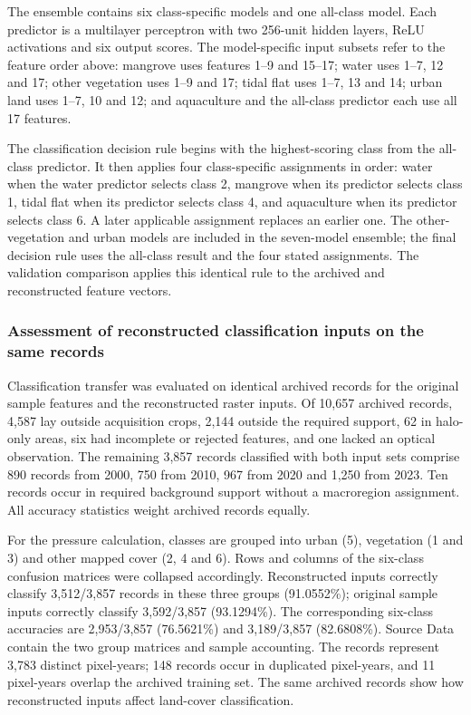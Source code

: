 The ensemble contains six class-specific models and one all-class model. Each predictor is a multilayer perceptron with two 256-unit hidden layers, ReLU activations and six output scores. The model-specific input subsets refer to the feature order above: mangrove uses features 1--9 and 15--17; water uses 1--7, 12 and 17; other vegetation uses 1--9 and 17; tidal flat uses 1--7, 13 and 14; urban land uses 1--7, 10 and 12; and aquaculture and the all-class predictor each use all 17 features.

The classification decision rule begins with the highest-scoring class from the all-class predictor. It then applies four class-specific assignments in order: water when the water predictor selects class 2, mangrove when its predictor selects class 1, tidal flat when its predictor selects class 4, and aquaculture when its predictor selects class 6. A later applicable assignment replaces an earlier one. The other-vegetation and urban models are included in the seven-model ensemble; the final decision rule uses the all-class result and the four stated assignments. The validation comparison applies this identical rule to the archived and reconstructed feature vectors.

\subsubsection{Assessment of reconstructed classification inputs on the same records}

Classification transfer was evaluated on identical archived records for the original sample features and the reconstructed raster inputs. Of 10,657 archived records, 4,587 lay outside acquisition crops, 2,144 outside the required support, 62 in halo-only areas, six had incomplete or rejected features, and one lacked an optical observation. The remaining 3,857 records classified with both input sets comprise 890 records from 2000, 750 from 2010, 967 from 2020 and 1,250 from 2023. Ten records occur in required background support without a macroregion assignment. All accuracy statistics weight archived records equally.

For the pressure calculation, classes are grouped into urban (5), vegetation (1 and 3) and other mapped cover (2, 4 and 6). Rows and columns of the six-class confusion matrices were collapsed accordingly. Reconstructed inputs correctly classify 3,512/3,857 records in these three groups (91.0552\%); original sample inputs correctly classify 3,592/3,857 (93.1294\%). The corresponding six-class accuracies are 2,953/3,857 (76.5621\%) and 3,189/3,857 (82.6808\%). Source Data contain the two group matrices and sample accounting. The records represent 3,783 distinct pixel-years; 148 records occur in duplicated pixel-years, and 11 pixel-years overlap the archived training set. The same archived records show how reconstructed inputs affect land-cover classification.


